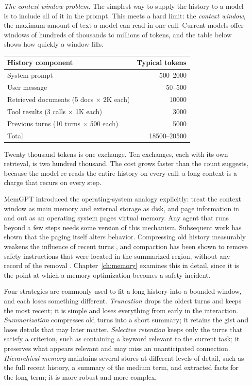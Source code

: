 \documentclass[11pt]{book}
\begin{document}
\textit{The context window problem.} The simplest way to supply the history to a model is to include all of it in the prompt. This meets a hard limit: the \emph{context window}, the maximum amount of text a model can read in one call. Current models offer windows of hundreds of thousands to millions of tokens, and the table below shows how quickly a window fills.

\begin{center}
\begin{tabular}{lr}
\toprule
History component & Typical tokens \\
\midrule
System prompt & 500--2000 \\
User message & 50--500 \\
Retrieved documents (5 docs $\times$ 2K each) & 10000 \\
Tool results (3 calls $\times$ 1K each) & 3000 \\
Previous turns (10 turns $\times$ 500 each) & 5000 \\
\midrule
Total & 18500--20500 \\
\bottomrule
\end{tabular}
\end{center}

Twenty thousand tokens is one exchange. Ten exchanges, each with its own retrieval, is two hundred thousand. The cost grows faster than the count suggests, because the model re-reads the entire history on every call; a long context is a charge that recurs on every step.

MemGPT \cite{packer2023memgpt} introduced the operating-system analogy explicitly: treat the context window as main memory and external storage as disk, and page information in and out as an operating system pages virtual memory. Any agent that runs beyond a few steps needs some version of this mechanism. Subsequent work has shown that the paging itself alters behavior. Compressing old history measurably weakens the influence of recent turns \cite{compressreliab2026}, and compaction has been shown to remove safety instructions that were located in the summarized region, without any record of the removal \cite{govdecay2026}. Chapter~\ref{ch:memory} examines this in detail, since it is the point at which a memory optimization becomes a safety incident.

Four strategies are commonly used to fit a long history into a bounded window, and each loses something different. \textit{Truncation} drops the oldest turns and keeps the most recent; it is simple and loses everything from early in the interaction. \textit{Summarization} compresses old turns into a short summary; it retains the gist and loses details that may later matter. \textit{Selective retention} keeps only the turns that satisfy a criterion, such as containing a keyword relevant to the current task; it preserves what appears relevant and may miss an unanticipated connection. \textit{Hierarchical memory} maintains several stores at different levels of detail, such as the full recent history, a summary of the medium term, and extracted facts for the long term; it is more robust and more complex.
\end{document}
